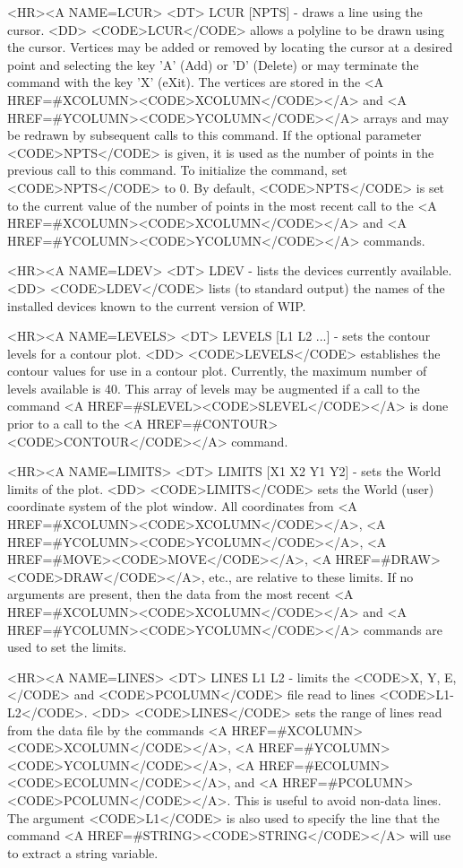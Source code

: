 \begin{rawhtml}
<HR><A NAME=LCUR>
<DT>
LCUR [NPTS] - draws a line using the cursor.
<DD>
	<CODE>LCUR</CODE> allows a polyline to be drawn using the cursor.
	Vertices may be added or removed by locating the cursor at a
	desired point and selecting the key 'A' (Add) or 'D' (Delete) or
	may terminate the command with the key 'X' (eXit).  The vertices
	are stored in the <A HREF=#XCOLUMN><CODE>XCOLUMN</CODE></A> and
	<A HREF=#YCOLUMN><CODE>YCOLUMN</CODE></A> arrays and may be
	redrawn by subsequent calls to this command.  If the optional
	parameter <CODE>NPTS</CODE> is given, it is used as the number
	of points in the previous call to this command.  To initialize
	the command, set <CODE>NPTS</CODE> to 0.  By default,
	<CODE>NPTS</CODE> is set to the current value of the number of
	points in the most recent call to the
	<A HREF=#XCOLUMN><CODE>XCOLUMN</CODE></A> and
	<A HREF=#YCOLUMN><CODE>YCOLUMN</CODE></A> commands.

<HR><A NAME=LDEV>
<DT>
LDEV - lists the devices currently available.
<DD>
	<CODE>LDEV</CODE> lists (to standard output) the names of
	the installed devices known to the current version of WIP.

<HR><A NAME=LEVELS>
<DT>
LEVELS [L1 L2 ...] - sets the contour levels for a contour plot.
<DD>
	<CODE>LEVELS</CODE> establishes the contour values for use in a
	contour plot.  Currently, the maximum number of levels available
	is 40.  This array of levels may be augmented if a call to the
	command <A HREF=#SLEVEL><CODE>SLEVEL</CODE></A> is done prior to
	a call to the <A HREF=#CONTOUR><CODE>CONTOUR</CODE></A> command.

<HR><A NAME=LIMITS>
<DT>
LIMITS [X1 X2 Y1 Y2] - sets the World limits of the plot.
<DD>
	<CODE>LIMITS</CODE> sets the World (user) coordinate system of
	the plot window.  All coordinates from
	<A HREF=#XCOLUMN><CODE>XCOLUMN</CODE></A>,
	<A HREF=#YCOLUMN><CODE>YCOLUMN</CODE></A>,
	<A HREF=#MOVE><CODE>MOVE</CODE></A>,
	<A HREF=#DRAW><CODE>DRAW</CODE></A>, etc.,
	are relative to these limits.  If no
	arguments are present, then the data from the most recent
	<A HREF=#XCOLUMN><CODE>XCOLUMN</CODE></A> and
	<A HREF=#YCOLUMN><CODE>YCOLUMN</CODE></A>
	commands are used to set the limits.

<HR><A NAME=LINES>
<DT>
LINES L1 L2 - limits the <CODE>X, Y, E,</CODE> and <CODE>PCOLUMN</CODE> file read to lines <CODE>L1-L2</CODE>.
<DD>
	<CODE>LINES</CODE> sets the range of lines read from the
	data file by the commands
	<A HREF=#XCOLUMN><CODE>XCOLUMN</CODE></A>,
	<A HREF=#YCOLUMN><CODE>YCOLUMN</CODE></A>,
	<A HREF=#ECOLUMN><CODE>ECOLUMN</CODE></A>, and
	<A HREF=#PCOLUMN><CODE>PCOLUMN</CODE></A>.
	This is useful to avoid non-data lines.  The argument <CODE>L1</CODE>
	is also used to specify the line that the command
	<A HREF=#STRING><CODE>STRING</CODE></A>
	will use to extract a string variable.


\end{rawhtml}
